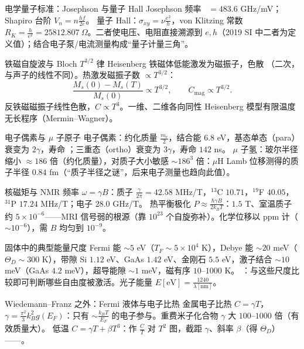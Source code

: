 \begin{结论}{电学量子标准：Josephson 与量子 Hall}
Josephson 频率 \ $=483.6$ GHz/mV；Shapiro 台阶 $V_n=n\frac{hf}{2e}$。
量子 Hall：$\sigma_{xy}=\nu\frac{e^2}h$，von Klitzing 常数 $R_K=\frac h{e^2}=25812.807\ \Omega$。二者使电压、电阻直接溯源到 $e,h$（2019 SI 中二者为定义值）；结合电子泵/电流测量构成“量子计量三角”。
\end{结论}

\begin{结论}{铁磁自旋波与 Bloch $T^{3/2}$ 律}
Heisenberg 铁磁体低能激发为磁振子，色散 （二次，与声子的线性不同）。热激发磁振子数 $\propto T^{3/2}$：
\[
\frac{M_s(0)-M_s(T)}{M_s(0)}\propto T^{3/2},\qquad C_{\text{mag}}\propto T^{3/2}.
\]
反铁磁磁振子线性色散，$C\propto T^3$。一维、二维各向同性 Heisenberg 模型有限温度无长程序（Mermin--Wagner）。
\end{结论}

\begin{结论}{电子偶素与 $\mu$ 子原子}
电子偶素：约化质量 $\frac{m_e}2$，结合能 $6.8$ eV，基态单态（para）衰变为 $2\gamma$，寿命 ；三重态（ortho）衰变为 $3\gamma$，寿命 $142$ ns。
$\mu$ 子氢：玻尔半径缩小 $\approx186$ 倍（约化质量），对质子大小敏感 $\sim186^3$ 倍：$\mu$H Lamb 位移测得的质子半径 $0.84$ fm（“质子半径之谜”，后来电子测量也趋向此值）。
\end{结论}

\begin{结论}{核磁矩与 NMR 频率}
$\omega=\gamma B$：质子 $\frac\gamma{2\pi}=42.58$ MHz/T，$^{13}$C $10.71$，$^{19}$F $40.05$，$^{31}$P $17.24$ MHz/T；电子 $28.0$ GHz/T。
热平衡极化 $P\approx\frac{\hbar\gamma B}{2k_BT}$：$1.5$ T、室温质子约 $5\times10^{-6}$——MRI 信号弱的根源（靠 $10^{23}$ 个自旋弥补）。化学位移以 ppm 计（$\sim10^{-6}$），需 $B$ 均匀到 $10^{-9}$。
\end{结论}

\begin{结论}{固体中的典型能量尺度}
Fermi 能 $\sim5$ eV（$T_F\sim5\times10^4$ K），Debye 能 $\sim20$ meV（$\Theta_D\sim300$ K），带隙 Si $1.12$ eV、GaAs $1.42$ eV、金刚石 $5.5$ eV，激子结合 $\sim10$ meV（GaAs $4.2$ meV），超导能隙 $\sim1$ meV，磁有序 $10$--$1000$ K。
：与这些尺度比较即可判断哪些自由度被激活。光子能量 $E[\text{eV}]=\frac{1240}{\lambda[\text{nm}]}$。
\end{结论}

\begin{结论}{Wiedemann--Franz 之外：Fermi 液体与电子比热}
金属电子比热 $C=\gamma T$，$\gamma=\frac{\pi^2}3k_B^2g(E_F)$：只有 $\sim\frac{k_BT}{E_F}$ 的电子参与。重费米子化合物 $\gamma$ 大 $100$--$1000$ 倍（有效质量大）。
低温 $C=\gamma T+\beta T^3$：作 $\frac CT$ 对 $T^2$ 图，截距 $\gamma$、斜率 $\beta$（得 $\Theta_D$）——。
\end{结论}

